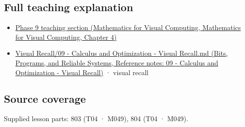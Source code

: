 \subsection{Full teaching explanation}\label{appendix-fecc1847f5a3-full-teaching-explanation}

\begin{itemize}
\tightlist
\item
  \href{../02-Mathematics-for-Visual-Computing/main.pdf\#nameddest=01-foundations-i-ch020-functions-limits-continuity-and-scalar-change}{Phase 9 teaching section (Mathematics for Visual Computing, Mathematics for Visual Computing, Chapter 4)}
\item
  \href{../01-Bits-Programs-and-Reliable-Systems/main.pdf\#nameddest=appendix-adf48f5dc5c1}{Visual Recall/09 - Calculus and Optimization - Visual Recall.md (Bits, Programs, and Reliable Systems, Reference notes: 09 - Calculus and Optimization - Visual Recall)} · visual recall
\end{itemize}

\subsection{Source coverage}\label{appendix-fecc1847f5a3-source-coverage}

Supplied lesson parts: 803 (T04 · M049), 804 (T04 · M049).
